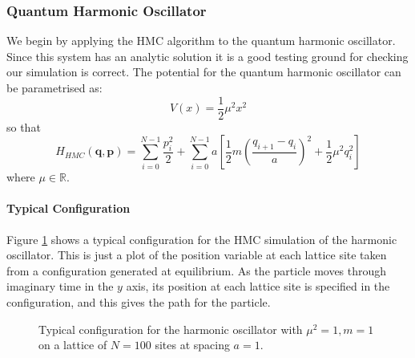 \documentclass[12pt]{article}
\begin{document}
    
        \subsubsection{Quantum Harmonic Oscillator}
            \label{sec:QuantumHarmonicOscillator}
            We begin by applying the HMC algorithm to the quantum harmonic oscillator. Since this system has an analytic solution it is a good testing ground for checking our simulation is correct. The potential for the quantum harmonic oscillator can be parametrised as:
            \begin{equation}
                \label{eq:HarmonicPotential}
                V\left(x\right) = \frac{1}{2}\mu^2x^2
            \end{equation}
            so that 
            \begin{equation}
                \label{eq:HarmonicHMCHamiltonian}
                H_{HMC}\left(\bm{q},\bm{p}\right) = \sum_{i=0}^{N-1} \frac{p_i^2}{2} + \sum_{i=0}^{N-1} a \left[\frac{1}{2}m\left(\frac{q_{i+1}-q_{i}}{a}\right)^2 + \frac{1}{2}\mu^2q_i^2\right]
            \end{equation}
            where $\mu \in \mathbb{R}$.

            \paragraph{Typical Configuration}
                Figure \ref{fig:TypicalHarmonicPath} shows a typical configuration for the HMC simulation of the harmonic oscillator. This is just a plot of the position variable at each lattice site taken from a configuration generated at equilibrium. As the particle moves through imaginary time in the $y$ axis, its position at each lattice site is specified in the configuration, and this gives the path for the particle.
                \begin{figure}
                    \centering
                        \caption{Typical configuration for the harmonic oscillator with $\mu^2 = 1, m = 1$ on a lattice of $N=100$ sites at spacing $a = 1$.}
                        \label{fig:TypicalHarmonicPath}
                \end{figure}
\end{document}
